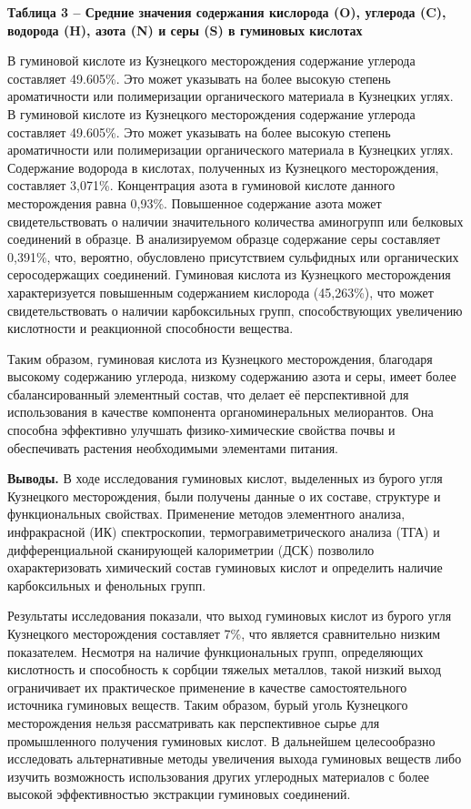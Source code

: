 {\bfseries Таблица 3 -- Средние значения содержания кислорода (O), углерода (C), водорода (H), азота (N) и серы (S) в гуминовых кислотах}


\begin{multicols}{2}
В гуминовой кислоте из Кузнецкого месторождения содержание углерода
составляет 49.605\%. Это может указывать на более высокую степень
ароматичности или полимеризации органического материала в Кузнецких
углях. В гуминовой кислоте из Кузнецкого месторождения содержание
углерода составляет 49.605\%. Это может указывать на более высокую
степень ароматичности или полимеризации органического материала в
Кузнецких углях. Содержание водорода в кислотах, полученных из
Кузнецкого месторождения, составляет 3,071\%. Концентрация азота в
гуминовой кислоте данного месторождения равна 0,93\%. Повышенное
содержание азота может свидетельствовать о наличии значительного
количества аминогрупп или белковых соединений в образце. В анализируемом
образце содержание серы составляет 0,391\%, что, вероятно, обусловлено
присутствием сульфидных или органических серосодержащих соединений.
Гуминовая кислота из Кузнецкого месторождения характеризуется повышенным
содержанием кислорода (45,263\%), что может свидетельствовать о наличии
карбоксильных групп, способствующих увеличению кислотности и реакционной
способности вещества.

Таким образом, гуминовая кислота из Кузнецкого месторождения, благодаря
высокому содержанию углерода, низкому содержанию азота и серы, имеет
более сбалансированный элементный состав, что делает её перспективной
для использования в качестве компонента органоминеральных мелиорантов.
Она способна эффективно улучшать физико-химические свойства почвы и
обеспечивать растения необходимыми элементами питания.

{\bfseries Выводы.} В ходе исследования гуминовых кислот, выделенных из
бурого угля Кузнецкого месторождения, были получены данные о их составе,
структуре и функциональных свойствах. Применение методов элементного
анализа, инфракрасной (ИК) спектроскопии, термогравиметрического анализа
(ТГА) и дифференциальной сканирующей калориметрии (ДСК) позволило
охарактеризовать химический состав гуминовых кислот и определить наличие
карбоксильных и фенольных групп.

Результаты исследования показали, что выход гуминовых кислот из бурого
угля Кузнецкого месторождения составляет 7\%, что является сравнительно
низким показателем. Несмотря на наличие функциональных групп,
определяющих кислотность и способность к сорбции тяжелых металлов, такой
низкий выход ограничивает их практическое применение в качестве
самостоятельного источника гуминовых веществ. Таким образом, бурый уголь
Кузнецкого месторождения нельзя рассматривать как перспективное сырье
для промышленного получения гуминовых кислот. В дальнейшем целесообразно
исследовать альтернативные методы увеличения выхода гуминовых веществ
либо изучить возможность использования других углеродных материалов с
более высокой эффективностью экстракции гуминовых соединений.


\end{multicols}
